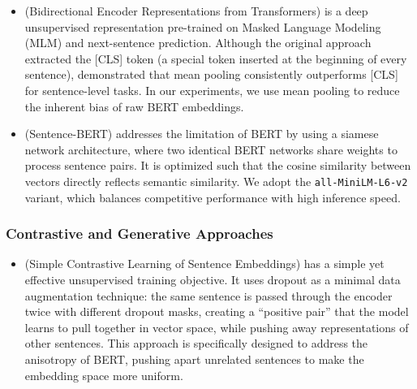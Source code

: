 \begin{itemize}
    \item \bertlarge{} (Bidirectional Encoder Representations from Transformers) \citep{bert} is a deep unsupervised representation pre-trained on Masked Language Modeling (MLM) and next-sentence prediction. Although the original approach extracted the [CLS] token (a special token inserted at the beginning of every sentence), \cite{Reimers_2019} demonstrated that mean pooling consistently outperforms [CLS] for sentence-level tasks. In our experiments, we use mean pooling to reduce the inherent bias of raw BERT embeddings.
    \item \sbert{} (Sentence-BERT) \citep{Reimers_2019} addresses the limitation of BERT by using a siamese network architecture, where two identical BERT networks share weights to process sentence pairs. It is optimized such that the cosine similarity between vectors directly reflects semantic similarity. We adopt the \texttt{all-MiniLM-L6-v2} variant, which balances competitive performance with high inference speed.
\end{itemize}

\subsubsection{Contrastive and Generative Approaches}

\begin{itemize}
    \item \ensimcse{} (Simple Contrastive Learning of Sentence Embeddings) \citep{gao-etal-2021-simcse} has a simple yet effective unsupervised training objective. It uses dropout as a minimal data augmentation technique: the same sentence is passed through the encoder twice with different dropout masks, creating a ``positive pair'' that the model learns to pull together in vector space, while pushing away representations of other sentences. This approach is specifically designed to address the anisotropy of BERT, pushing apart unrelated sentences to make the embedding space more uniform.
\end{itemize}

